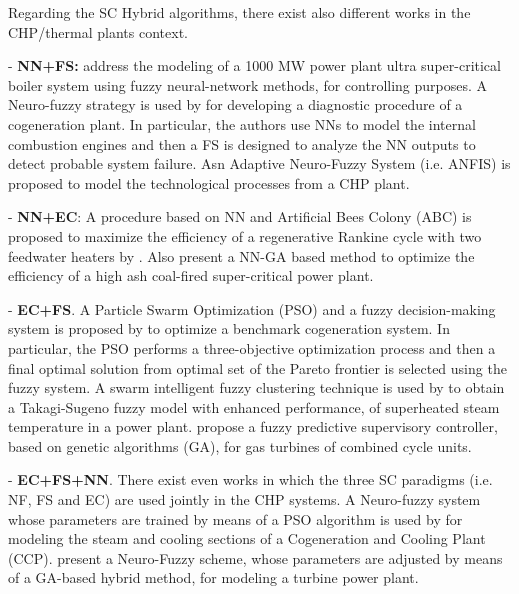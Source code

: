 \bigskip
\par
Regarding the SC Hybrid algorithms, there exist also different works in the CHP/thermal plants context. 

- \textbf{NN+FS:} \cite{Liu2010} address the modeling of a 1000 MW power plant ultra super-critical boiler system using fuzzy neural-network methods, for controlling purposes. A Neuro-fuzzy strategy is used by \cite{Bare-2005} for developing a diagnostic procedure of a cogeneration plant. In particular, the authors use NNs to model the internal combustion engines and then a FS is designed to analyze the NN outputs to detect probable system failure. Asn Adaptive Neuro-Fuzzy System (i.e. ANFIS) is proposed \cite{Mastacan-2005} to model the technological processes from a CHP plant.


\bigskip
\par
- \textbf{NN+EC}: A procedure based on NN and Artificial Bees Colony (ABC) is proposed to maximize the efficiency of a regenerative Rankine cycle with two feedwater heaters by \cite{Rashidi-2011}. Also \cite{Suresh-2011} present a NN-GA based method to optimize the efficiency of a high ash coal-fired super-critical power plant.

\bigskip
\par
- \textbf{EC+FS}. A Particle Swarm Optimization (PSO) and a fuzzy decision-making system is proposed by \cite{Sayyaadi-2011} to optimize a benchmark cogeneration system. In particular, the PSO performs a three-objective optimization process and then a final optimal solution from optimal set of the Pareto frontier is selected using the fuzzy system. A swarm intelligent fuzzy clustering technique is used by \cite{Su-12} to obtain a Takagi-Sugeno fuzzy model with enhanced performance, of  superheated steam temperature in a power plant. \cite{Saez-2007} propose a fuzzy predictive supervisory controller, based on genetic algorithms (GA), for gas turbines of combined cycle units.

\bigskip
\par
- \textbf{EC+FS+NN}.  There exist even works in which the three SC paradigms (i.e. NF, FS and EC) are used jointly in the CHP systems. A Neuro-fuzzy system whose parameters are trained by means of a PSO  algorithm is used by \cite{Tamiru-2009} for modeling  the steam and cooling sections of a Cogeneration and Cooling Plant (CCP). \cite{Kwun-2007} present a Neuro-Fuzzy scheme, whose parameters are adjusted by means of a GA-based hybrid method, for modeling a turbine power plant. 

